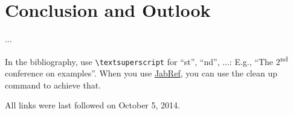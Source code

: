 \documentclass[runningheads,a4paper]{llncs}
\newcommand{\commentatside}[1]{\pdfcomment[color={0.045 0.278 0.643},icon=Note]{#1}}
\newcommand{\todo}[1]{\commentatside{#1}}
\begin{document}


%
%

%
%
%
%
%
%
%

\section{Conclusion and Outlook}

...

In the bibliography, use \texttt{\textbackslash textsuperscript} for ``st'', ``nd'', ...:
E.g., \enquote{The 2\textsuperscript{nd} conference on examples}.
When you use \href{http://www.jabref.org}{JabRef}, you can use the clean up command to achieve that.




All links were last followed on October 5, 2014.
\end{document}
